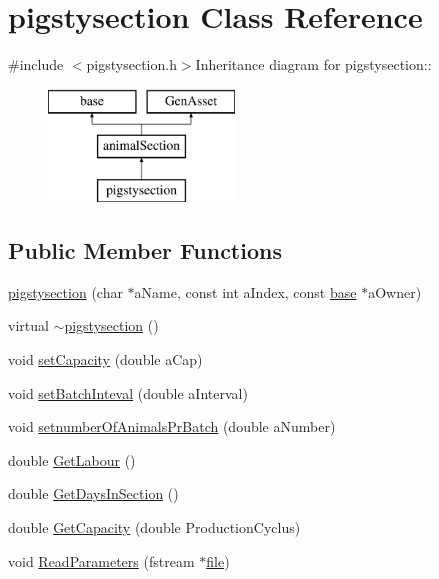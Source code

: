 \hypertarget{classpigstysection}{
\section{pigstysection Class Reference}
\label{classpigstysection}
}


{\ttfamily \#include $<$pigstysection.h$>$}Inheritance diagram for pigstysection::\begin{figure}[H]
\begin{center}
\leavevmode
\includegraphics[height=3cm]{classpigstysection}
\end{center}
\end{figure}
\subsection*{Public Member Functions}
\begin{DoxyCompactItemize}
\item 
\hyperlink{classpigstysection_a7a2d131cd582c2d5b7029b49468818d9}{pigstysection} (char $\ast$aName, const int aIndex, const \hyperlink{classbase}{base} $\ast$aOwner)
\item 
virtual \hyperlink{classpigstysection_a6b4916d8fc18b3b587a4fd88fbc006ac}{$\sim$pigstysection} ()
\item 
void \hyperlink{classpigstysection_ab6c492cf471f7904afeea8cdf91221ad}{setCapacity} (double aCap)
\item 
void \hyperlink{classpigstysection_a9fa30c14febd9f8f73f22561fd0dbd7f}{setBatchInteval} (double aInterval)
\item 
void \hyperlink{classpigstysection_a5a3773bf7e4def1e30e69740cbe66c9a}{setnumberOfAnimalsPrBatch} (double aNumber)
\item 
double \hyperlink{classpigstysection_a1a6111cae83f84e265366223576617c1}{GetLabour} ()
\item 
double \hyperlink{classpigstysection_a1f373e9d4c4b75379502baebd97fe62d}{GetDaysInSection} ()
\item 
double \hyperlink{classpigstysection_ae1edf71bb393463a034049cbf33b92c5}{GetCapacity} (double ProductionCyclus)
\item 
void \hyperlink{classpigstysection_acce45c15afb18b52d83a351643d03b57}{ReadParameters} (fstream $\ast$\hyperlink{classbase_a3af52ee9891719d09b8b19b42450b6f6}{file})
\end{DoxyCompactItemize}


